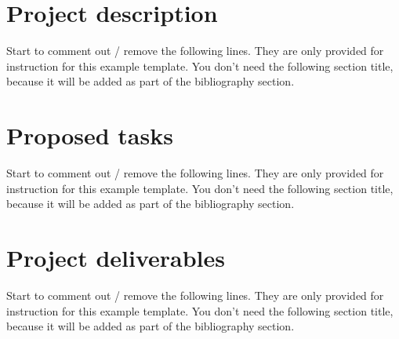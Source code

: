 \documentclass[11pt,fleqn,twoside]{article}
\begin{document}
\wordcount{}


\mmp
\tableofcontents
\newpage
\setcounter{tocdepth}{3} %


\section{Project description}
Start to comment out / remove the following lines. They are only provided for instruction for this example template.  You don't need the following section title, because it will be added as part of the bibliography section. 

\section{Proposed tasks}

Start to comment out / remove the following lines. They are only provided for instruction for this example template.  You don't need the following section title, because it will be added as part of the bibliography section. 
\section{Project deliverables}
Start to comment out / remove the following lines. They are only provided for instruction for this example template.  You don't need the following section title, because it will be added as part of the bibliography section. 
\end{document}
